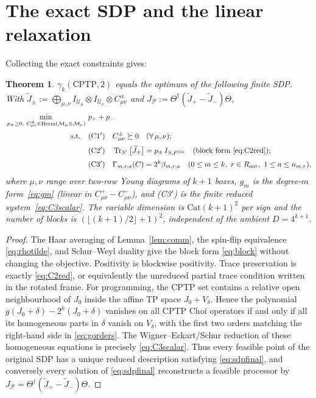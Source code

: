 \documentclass[11pt]{article}
\newtheorem{theorem}{Theorem}
\newcommand{\Tr}{\operatorname{Tr}}
\newcommand{\cP}{\mathcal{P}}
\newcommand{\CPTP}{\mathrm{CPTP}}
\newcommand{\ox}{\otimes}
\newcommand{\dg}{\dagger}
\begin{document}
\section{The exact SDP and the linear relaxation}
Collecting the exact constraints gives:
\begin{theorem}\label{thm:reduced}
$\gamma_k(\CPTP,2)$ equals the optimum of the following finite SDP. With
$\widetilde J_\pm:=\bigoplus_{\mu,\nu}I_{\mathcal U_\mu}\ox I_{\mathcal U_\nu}\ox C^{\pm}_{\mu\nu}$
and $J_\cP:=\Theta^{\dg}(\widetilde J_+-\widetilde J_-)\Theta$,
\begin{equation}\label{eq:sdpfinal}
\begin{aligned}
\min_{\,p_\pm\ge0,\ C^{\pm}_{\mu\nu}\in\operatorname{Herm}(\mathcal M_\mu\ox\mathcal M_\nu)}\ & p_++p_-\\[2pt]
\text{s.t.}\quad
&\text{(C1$'$)}\quad C^{\pm}_{\mu\nu}\succeq0\quad(\forall\,\mu,\nu);\\[2pt]
&\text{(C2$'$)}\quad \Tr_{S'}\big[\widetilde J_\pm\big]=p_\pm\,I_{S,P^{\ox k}}
   \quad(\text{block form }\eqref{eq:C2red});\\[2pt]
&\text{(C3$'$)}\quad \Gamma_{m,r,a}(C)=2^k\beta_{m,r,a}
   \quad(0\le m\le k,\ r\in R_{\rm out},\ 1\le a\le n_{m,r}),
\end{aligned}
\end{equation}
where $\mu,\nu$ range over two-row Young diagrams of $k+1$ boxes, $g_m$ is the degree-$m$
form~\eqref{eq:gm} (linear in $C^{+}_{\mu\nu}-C^{-}_{\mu\nu}$), and (C3$'$) is the
finite reduced system~\eqref{eq:C3scalar}.
The variable dimension is $\mathrm{Cat}(k+1)^2$ per sign and the number of blocks is
$(\lfloor(k+1)/2\rfloor+1)^2$, independent of the ambient $D=4^{k+1}$.
\end{theorem}

\begin{proof}
The Haar averaging of Lemma~\ref{lem:comm}, the spin-flip equivalence
\eqref{eq:rhotilde}, and Schur--Weyl duality give the block form
\eqref{eq:block} without changing the objective. Positivity is blockwise positivity.
Trace preservation is exactly \eqref{eq:C2red}, or equivalently the unreduced partial
trace condition written in the rotated frame. For programming, the CPTP set contains a
relative open neighbourhood of $J_0$ inside the affine TP space
$J_0+V_\delta$. Hence the polynomial
$g(J_0+\delta)-2^k(J_0+\delta)$ vanishes on all CPTP Choi operators if and only if
all its homogeneous parts in $\delta$ vanish on $V_\delta$, with the first two orders
matching the right-hand side in \eqref{eq:gorders}. The Wigner--Eckart/Schur reduction
of these homogeneous equations is precisely \eqref{eq:C3scalar}. Thus every feasible
point of the original SDP has a unique reduced description satisfying
\eqref{eq:sdpfinal}, and conversely every solution of \eqref{eq:sdpfinal} reconstructs
a feasible processor by $J_\cP=\Theta^\dg(\widetilde J_+-\widetilde J_-)\Theta$.
\end{proof}
\end{document}
